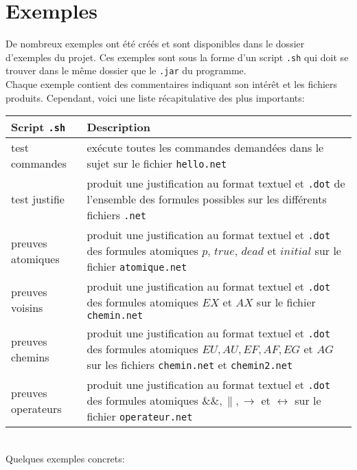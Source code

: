 \documentclass[dvipsnames]{report}
\begin{document}
\section{Exemples}

De nombreux exemples ont été créés et sont disponibles dans le dossier d'exemples du projet. Ces exemples sont sous la forme d'un script \texttt{.sh} qui doit se trouver dans le même dossier que le \texttt{.jar} du programme.\\

Chaque exemple contient des commentaires indiquant son intérêt et les fichiers produits. Cependant, voici une liste récapitulative des plus importants:\\

\noindent\begin{tabularx}{\linewidth}{| @{}l | X@{} |}
\hline
Script \texttt{.sh} & Description \\
\hline
test commandes & exécute toutes les commandes demandées dans le sujet sur le fichier \texttt{hello.net} \\
\hline
test justifie & produit une justification au format textuel et \texttt{.dot} de l'ensemble des formules possibles sur les différents fichiers \texttt{.net} \\
\hline
preuves atomiques & produit une justification au format textuel et \texttt{.dot} des formules atomiques $p$, $true$, $dead$ et $initial$ sur le fichier \texttt{atomique.net} \\
\hline
preuves voisins & produit une justification au format textuel et \texttt{.dot} des formules atomiques $EX$ et $AX$ sur le fichier \texttt{chemin.net} \\
\hline
preuves chemins & produit une justification au format textuel et \texttt{.dot} des formules atomiques $EU, AU, EF, AF, EG$ et $AG$ sur les fichiers \texttt{chemin.net} et \texttt{chemin2.net} \\
\hline
preuves operateurs & produit une justification au format textuel et \texttt{.dot} des formules atomiques $\&\&, \|, \rightarrow$ et $\leftrightarrow$ sur le fichier \texttt{operateur.net} \\
\hline
\end{tabularx}

~\\\indent Quelques exemples concrets:\\
\end{document}
